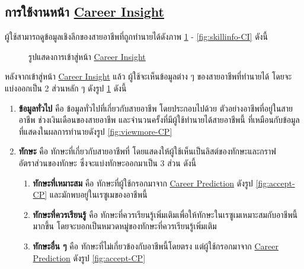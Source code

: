 \subsection{การใช้งานหน้า \hyperref[subsec:Career Insight]{Career Insight}}
ผู้ใช้สามารถดูข้อมูลเชิงลึกของสายอาชีพที่ถูกทำนายได้ดังภาพ \ref{fig:home-CI} - \ref{fig:skillinfo-CI} ดังนี้
\begin{figure}[H]\centering
    \caption{รูปแสดงการเข้าสู่หน้า \hyperref[subsec:Career Insight]{Career Insight}}\label{fig:home-CI}
\end{figure}
หลังจากเข้าสู่หน้า \hyperref[subsec:Career Insight]{Career Insight} แล้ว ผู้ใช้จะเห็นข้อมูลต่าง ๆ ของสายอาชีพที่ทำนายได้ โดยจะแบ่งออกเป็น 2 ส่วนหลัก ๆ ดังรูป \ref{fig:home-CI} ดังนี้ 
\begin{enumerate}
    \item \textbf{ข้อมูลทั่วไป} คือ ข้อมูลทั่วไปที่เกี่ยวกับสายอาชีพ โดยประกอบไปด้วย ตัวอย่างอาชีพที่อยู่ในสายอาชีพ ช่วงเงินเดือนของสายอาชีพ และจำนวนครั้งที่มีผู้ใช้ทำนายได้สายอาชีพนี้ ที่เหมือนกับข้อมูลที่แสดงในผลการทำนายดังรูป \ref{fig:viewmore-CP}
    \item \textbf{ทักษะ} คือ ทักษะที่เกี่ยวกับสายอาชีพที่ โดยแสดงให้ผู้ใช้เห็นเป็นลิสต์ของทักษะและกราฟอัตราส่วนของทักษะ ซึ่งจะแบ่งทักษะออกมาเป็น 3 ส่วน ดังนี้
    \begin{enumerate}
        \item \textbf{ทักษะที่เหมาะสม} คือ ทักษะที่ผู้ใช้กรอกมาจาก \hyperref[subsec:Career Prediction]{Career Prediction} ดังรูป \ref{fig:accept-CP} และมักพบอยู่ในเรซูเมของอาชีพนี้
        \item \textbf{ทักษะที่ควรเรียนรู้} คือ ทักษะที่ควรเรียนรู้เพิ่มเติมเพื่อให้ทักษะในเรซูเมเหมาะสมกับอาชีพนี้มากขึ้น โดยจะบอกเป็นหมวดหมู่ของทักษะที่ควรเรียนรู้เพิ่มเติม
        \item \textbf{ทักษะอื่น ๆ} คือ ทักษะที่ไม่เกี่ยวข้องกับอาชีพนี้โดยตรง แต่ผู้ใช้กรอกมาจาก \hyperref[subsec:Career Prediction]{Career Prediction} ดังรูป \ref{fig:accept-CP}
    \end{enumerate}
\end{enumerate}
